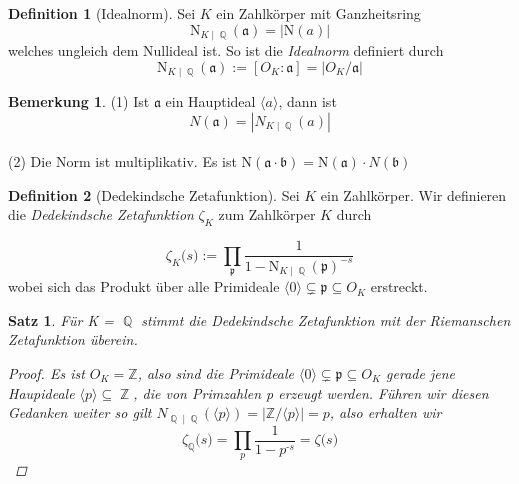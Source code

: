\documentclass[10pt,a4paper]{article}
\theoremstyle{plain}
\newtheorem{satz}[thm]{Satz}
\theoremstyle{definition}
\newtheorem{defn}{Definition}[section]
\newtheorem*{note}{Bemerkung}
\theoremstyle{remark}
\DeclareMathOperator{\Q}{\mathbb{Q}}
\DeclareMathOperator{\Z}{\mathbb{Z}}
\begin{document}
\begin{defn}[Idealnorm]

Sei $\textit{K}$ ein Zahlkörper mit Ganzheitsring $$\mathrm{N}_{K \mid \Q}(\mathfrak{a}) = |\mathrm{N}(a)|$$ welches ungleich dem Nullideal ist. So ist die \textit{Idealnorm} definiert durch $$\mathrm{N}_{K \mid \Q}(\mathfrak{a}) := [O_{K} : \mathfrak{a} ] = \vert O_{K} / \mathfrak{a} \vert$$

\end{defn}

\begin{note}
(1) Ist $\mathfrak{a}$ ein Hauptideal $\langle a \rangle$, dann ist $$N(\mathfrak{a}) = |N_{K\mid \Q}(a)|$$
\\
(2) Die Norm ist multiplikativ. Es ist N$(\mathfrak{a}\cdot \mathfrak{b}) = $N$(\mathfrak{a})\cdot N(\mathfrak{b})$

\end{note}

\begin{defn}[Dedekindsche Zetafunktion]

Sei $\textit{K}$ ein Zahlkörper. Wir definieren die \textit{Dedekindsche Zetafunktion} \textit{$\zeta_{\textit{K}}$} zum Zahlkörper $\textit{K}$ durch
	
$$\zeta_{\textit{K}} \textit{(s)}:= \prod_{\mathfrak{p}}\frac{1}{1-\mathrm{N}_{K \mid \Q}(\mathfrak{p})^{-s}}$$
wobei sich das Produkt über alle Primideale $\langle0\rangle\subsetneq \mathfrak{p} \subseteq O_{\textit{K}}$ erstreckt. 
\end{defn}

\begin{satz}

Für \textit{K} = $\Q$ stimmt die Dedekindsche Zetafunktion mit der Riemanschen Zetafunktion überein.

\begin{proof}
Es ist $O_\textit{K} = \mathbb{Z}$, also sind die Primideale $\langle0\rangle\subsetneq \mathfrak{p} \subseteq O_{\textit{K}}$ gerade jene Haupideale $\langle \textit{p}\rangle\subseteq\Z$, die von Primzahlen \textit{p} erzeugt werden. Führen wir diesen Gedanken weiter so gilt $N_{\Q\mid\Q}(\langle \textit{p}\rangle) = | \mathbb{Z}/\langle \textit{p}\rangle| = \textit{p}$, also erhalten wir  $$\zeta_{\Q} \textit{(s)}= \prod_{\textit{p}} \frac{1}{1-\textit{p}^\textit{-s}} = \zeta \textit{(s)} $$

\end{proof}

\end{satz}
\end{document}
